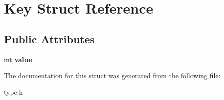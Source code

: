 \hypertarget{structKey}{
\section{Key Struct Reference}
\label{structKey}
}
\subsection*{Public Attributes}
\begin{DoxyCompactItemize}
\item 
\hypertarget{structKey_a7f44d66b98cc942d0a0b78a838587a19}{
int {\bfseries value}}
\label{structKey_a7f44d66b98cc942d0a0b78a838587a19}

\end{DoxyCompactItemize}


The documentation for this struct was generated from the following file:\begin{DoxyCompactItemize}
\item 
type.h\end{DoxyCompactItemize}
